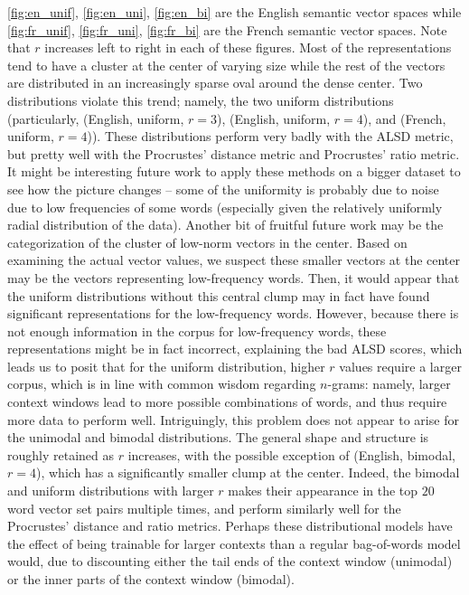 \documentclass[12pt, usenames]{article}
\theoremstyle{definition}
\theoremstyle{definition}
\theoremstyle{definition}
\begin{document}
\autoref{fig:en_unif}, \autoref{fig:en_uni}, \autoref{fig:en_bi} are the English semantic vector spaces
while \autoref{fig:fr_unif}, \autoref{fig:fr_uni}, \autoref{fig:fr_bi} are the French semantic vector spaces. Note that $r$ increases left to right in each of these figures. Most of the representations tend to have a cluster at the center of varying size while the rest of the vectors are distributed in an increasingly sparse oval around the dense center. Two distributions violate this trend; namely, the two uniform distributions (particularly, (English, uniform, $r = 3$), (English, uniform, $r = 4$), and (French, uniform, $r = 4$)). These distributions perform very badly with the ALSD metric, but pretty well with the Procrustes' distance metric and Procrustes' ratio metric. It might be interesting future work to apply these methods on a bigger dataset to see how the picture changes -- some of the uniformity is probably due to noise due to low frequencies of some words (especially given the relatively uniformly radial distribution of the data). Another bit of fruitful future work may be the categorization of the cluster of low-norm vectors in the center. Based on examining the actual vector values, we suspect these smaller vectors at the center may be the vectors representing low-frequency words.
Then, it would appear that the uniform distributions without this central clump may in fact have found significant representations for the low-frequency words. However, because there is not enough information in the corpus for low-frequency words, these representations might be in fact incorrect, explaining the bad ALSD scores, which leads us to posit that for the uniform distribution, higher $r$ values require a larger corpus, which is in line with common wisdom regarding $n$-grams: namely, larger context windows lead to more possible combinations of words, and thus require more data to perform well. Intriguingly, this problem does not appear to arise for the unimodal and bimodal distributions. The general shape and structure is roughly retained as $r$ increases, with the possible exception of (English, bimodal, $r = 4$), which has a significantly smaller clump at the center. Indeed, the bimodal and uniform distributions with larger $r$ makes their appearance in the top $20$ word vector set pairs multiple times, and perform similarly well for the Procrustes' distance and ratio metrics. Perhaps these distributional models have the effect of being trainable for larger contexts than a regular bag-of-words model would, due to discounting either the tail ends of the context window (unimodal) or the inner parts of the context window (bimodal). 
\end{document}
